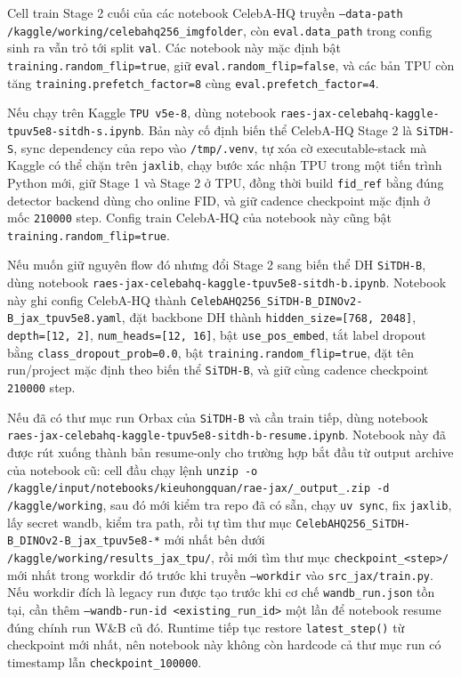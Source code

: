 Cell train Stage 2 cuối của các notebook CelebA-HQ truyền
\texttt{--data-path /kaggle/working/celebahq256\_imgfolder}, còn
\texttt{eval.data\_path} trong config sinh ra vẫn trỏ tới split
\texttt{val}. Các notebook này mặc định bật
\texttt{training.random\_flip=true}, giữ \texttt{eval.random\_flip=false}, và
các bản TPU còn tăng \texttt{training.prefetch\_factor=8} cùng
\texttt{eval.prefetch\_factor=4}.

Nếu chạy trên Kaggle \texttt{TPU v5e-8}, dùng notebook
\texttt{raes-jax-celebahq-kaggle-tpuv5e8-sitdh-s.ipynb}. Bản này cố định biến thể
CelebA-HQ Stage 2 là \texttt{SiTDH-S}, sync dependency của repo vào
\texttt{/tmp/.venv}, tự xóa cờ executable-stack mà Kaggle có thể chặn trên
\texttt{jaxlib}, chạy bước xác nhận TPU trong một tiến trình Python mới, giữ
Stage 1 và Stage 2 ở TPU, đồng thời build \texttt{fid\_ref} bằng đúng detector
backend dùng cho online FID, và giữ cadence checkpoint mặc định ở mốc
\texttt{210000} step. Config train CelebA-HQ của notebook này cũng bật
\texttt{training.random\_flip=true}.

Nếu muốn giữ nguyên flow đó nhưng đổi Stage 2 sang biến thể DH
\texttt{SiTDH-B},
dùng notebook \texttt{raes-jax-celebahq-kaggle-tpuv5e8-sitdh-b.ipynb}. Notebook
này ghi config CelebA-HQ thành
\texttt{CelebAHQ256\_SiTDH-B\_DINOv2-B\_jax\_tpuv5e8.yaml}, đặt backbone DH thành
\texttt{hidden\_size=[768, 2048]}, \texttt{depth=[12, 2]},
\texttt{num\_heads=[12, 16]}, bật \texttt{use\_pos\_embed}, tắt label dropout
bằng \texttt{class\_dropout\_prob=0.0}, bật
\texttt{training.random\_flip=true}, đặt tên run/project mặc định theo biến thể
\texttt{SiTDH-B}, và
giữ cùng cadence checkpoint \texttt{210000} step.

Nếu đã có thư mục run Orbax của \texttt{SiTDH-B} và cần train tiếp, dùng
notebook \texttt{raes-jax-celebahq-kaggle-tpuv5e8-sitdh-b-resume.ipynb}. Notebook
này đã được rút xuống thành bản resume-only cho trường hợp bắt đầu từ output
archive của notebook cũ: cell đầu chạy lệnh \texttt{unzip -o
/kaggle/input/notebooks/kieuhongquan/rae-jax/\_output\_.zip -d
/kaggle/working}, sau đó mới kiểm tra repo đã có sẵn, chạy \texttt{uv sync},
fix \texttt{jaxlib}, lấy secret wandb, kiểm tra path, rồi tự tìm thư mục
\texttt{CelebAHQ256\_SiTDH-B\_DINOv2-B\_jax\_tpuv5e8-*} mới nhất bên dưới
\texttt{/kaggle/working/results\_jax\_tpu/}, rồi mới tìm thư mục
\texttt{checkpoint\_<step>/} mới nhất trong workdir đó trước khi truyền
\texttt{--workdir} vào \texttt{src\_jax/train.py}. Nếu workdir đích là legacy
run được tạo trước khi cơ chế \texttt{wandb\_run.json} tồn tại, cần thêm
\texttt{--wandb-run-id <existing\_run\_id>} một lần để notebook resume đúng
chính run W\&B cũ đó. Runtime tiếp tục restore \texttt{latest\_step()} từ
checkpoint mới nhất, nên notebook này không còn hardcode cả thư mục run có
timestamp lẫn \texttt{checkpoint\_100000}.
